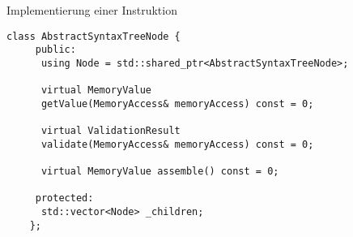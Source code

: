 
\begin{frame}[fragile]{Implementierung einer Instruktion}
  \pause
  \begin{lstlisting}[style=C++,emph={getValue, validate, assemble},emphstyle=\underline]
    class AbstractSyntaxTreeNode {
     public:
      using Node = std::shared_ptr<AbstractSyntaxTreeNode>;

      virtual MemoryValue
      getValue(MemoryAccess& memoryAccess) const = 0;

      virtual ValidationResult
      validate(MemoryAccess& memoryAccess) const = 0;

      virtual MemoryValue assemble() const = 0;
      
     protected:
      std::vector<Node> _children;
    };
  \end{lstlisting}
\end{frame}


